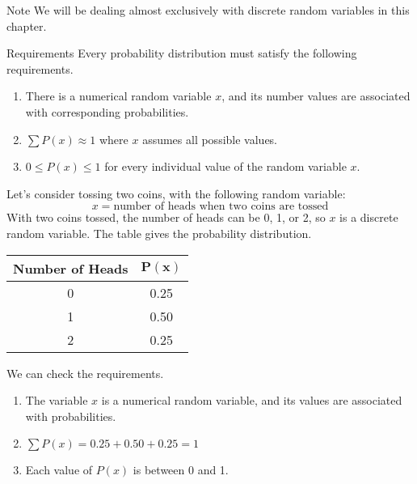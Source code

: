 \documentclass{beamer}
\newcommand{\prob}[1]{P\left(#1\right)}
\begin{document}
\begin{frame}
\begin{block}{Note}
We will be dealing almost exclusively with discrete random variables in this chapter.
\end{block}\pause

\begin{block}{Requirements}
Every probability distribution must satisfy the following requirements.
\begin{enumerate}
\item There is a numerical random variable $x$, and its number values are associated with corresponding probabilities.\pause
\item $\sum \prob{x}\approx 1$ where $x$ assumes all possible values.\pause
\item $0\leq\prob{x}\leq 1$ for every individual value of the random variable $x$.
\end{enumerate}
\end{block}
\end{frame}

\begin{frame}
\begin{example}
Let's consider tossing two coins, with the following random variable:
\begin{equation*}
x=\text{number of heads when two coins are tossed}
\end{equation*}\pause
With two coins tossed, the number of heads can be 0, 1, or 2, so $x$ is a discrete random variable. The table gives the probability distribution.
\begin{center}
\begin{tabular}{|c|c|}\hline
\textbf{Number of Heads} & $\boldsymbol{\prob{x}}$ \\\hline
0 & 0.25 \\
1 & 0.50 \\
2 & 0.25\\\hline
\end{tabular}
\end{center}\pause

We can check the requirements.
\begin{enumerate}
\item The variable $x$ is a numerical random variable, and its values are associated with probabilities.\pause
\item $\sum \prob{x}=0.25+0.50+0.25=1$\pause
\item Each value of $\prob{x}$ is between 0 and 1.
\end{enumerate}
\end{example}
\end{frame}
\end{document}
